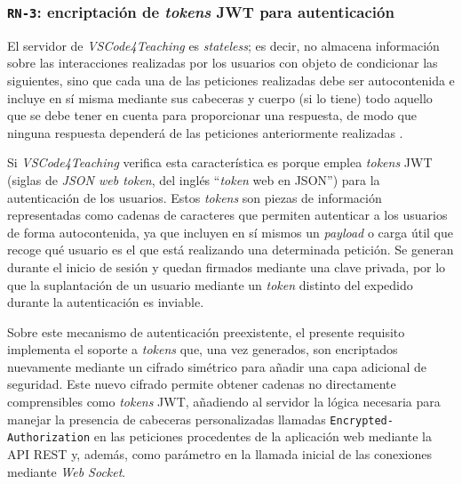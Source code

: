 \subsubsection{\texttt{RN-3}: encriptación de \textit{tokens} JWT para autenticación}
\label{subsec:rn3}

El servidor de \textit{VSCode4Teaching} es \textit{stateless}; es decir, no almacena información sobre las interacciones realizadas por los usuarios con objeto de condicionar las siguientes, sino que cada una de las peticiones realizadas debe ser autocontenida e incluye en sí misma mediante sus cabeceras y cuerpo (si lo tiene) todo aquello que se debe tener en cuenta para proporcionar una respuesta, de modo que ninguna respuesta dependerá de las peticiones anteriormente realizadas \cite{Stateless}.

Si \textit{VSCode4Teaching} verifica esta característica es porque emplea \textit{tokens} JWT (siglas de \textit{JSON web token}, del inglés ``\textit{token} web en JSON'') para la autenticación de los usuarios. Estos \textit{tokens} son piezas de información representadas como cadenas de caracteres que permiten autenticar a los usuarios de forma autocontenida, ya que incluyen en sí mismos un \textit{payload} o carga útil que recoge qué usuario es el que está realizando una determinada petición. Se generan durante el inicio de sesión y quedan firmados mediante una clave privada, por lo que la suplantación de un usuario mediante un \textit{token} distinto del expedido durante la autenticación es inviable.

Sobre este mecanismo de autenticación preexistente, el presente requisito implementa el soporte a \textit{tokens} que, una vez generados, son encriptados nuevamente mediante un cifrado simétrico para añadir una capa adicional de seguridad. Este nuevo cifrado permite obtener cadenas no directamente comprensibles como \textit{tokens} JWT, añadiendo al servidor la lógica necesaria para manejar la presencia de cabeceras personalizadas llamadas \texttt{Encrypted-Authorization} en las peticiones procedentes de la aplicación web mediante la API REST y, además, como parámetro en la llamada inicial de las conexiones mediante \textit{Web Socket}.
